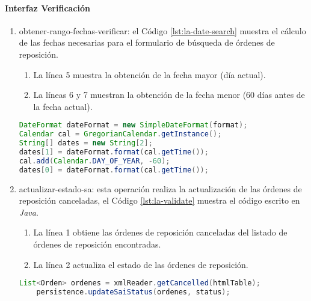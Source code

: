 \paragraph{\indent Interfaz Verificación}
\begin{enumerate}
	\item obtener-rango-fechas-verificar: el Código \ref{lst:la-date-search} muestra el cálculo de las fechas necesarias para el formulario de búsqueda de órdenes de reposición.
	\begin{enumerate}
		\item La línea 5 muestra la obtención de la fecha mayor (día actual).
		\item La líneas 6 y 7 muestran la obtención de la fecha menor (60 días antes de la fecha actual).
	\end{enumerate}
	\begin{lstlisting}[language=Java, caption={Cálculo del rango de fechas para buscar órdenes de reposición canceladas.}, captionpos=b, label={lst:la-date-search}]
DateFormat dateFormat = new SimpleDateFormat(format);
Calendar cal = GregorianCalendar.getInstance();
String[] dates = new String[2];
dates[1] = dateFormat.format(cal.getTime());
cal.add(Calendar.DAY_OF_YEAR, -60);
dates[0] = dateFormat.format(cal.getTime());
	\end{lstlisting}

	\item actualizar-estado-sa: esta operación realiza la actualización de las órdenes de reposición canceladas, el Código \ref{lst:la-validate} muestra el código escrito en \textit{Java}.
	\begin{enumerate}
		\item La línea 1 obtiene las órdenes de reposición canceladas del listado de órdenes de reposición encontradas.
		\item La línea 2 actualiza el estado de las órdenes de reposición.
	\end{enumerate}
	\begin{lstlisting}[language=Java, caption={Actualización de órdenes de reposición canceladas.}, captionpos=b, label={lst:la-validate}]
	List<Orden> ordenes = xmlReader.getCancelled(htmlTable);
	persistence.updateSaiStatus(ordenes, status);
	\end{lstlisting}
\end{enumerate}
